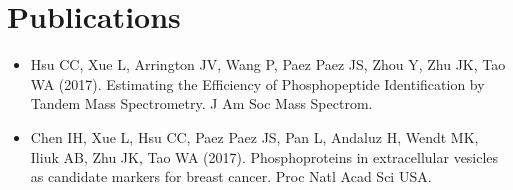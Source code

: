 \documentclass[]{deedy-resume-openfont}
\begin{document}
\begin{minipage}[t]{0.66\textwidth}
%
%
%

\section{Publications}
\begin{itemize}
	\item Hsu CC, Xue L, Arrington JV, Wang P, Paez Paez JS, Zhou Y, Zhu JK, Tao WA (2017). Estimating the Efficiency of Phosphopeptide Identification by Tandem Mass Spectrometry. J Am Soc Mass Spectrom.
    \item Chen IH, Xue L, Hsu CC, Paez Paez JS, Pan L, Andaluz H, Wendt MK, Iliuk AB, Zhu JK, Tao WA (2017). Phosphoproteins in extracellular vesicles as candidate markers for breast cancer. Proc Natl Acad Sci USA.
    
\end{itemize}
\sectionsep

\end{minipage}
\end{document}
